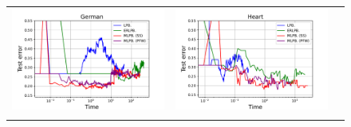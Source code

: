\begin{figure}[p]
\begin{tabular}{ccc}
\begin{minipage}[t]{0.31\hsize}
            \includegraphics[keepaspectratio, scale=0.30]
            {figure/test_logtime_german.pdf}
        \end{minipage}
        &
        \begin{minipage}[t]{0.31\hsize}
            \centering
            \includegraphics[keepaspectratio, scale=0.30]
            {figure/test_logtime_heart.pdf}
        \end{minipage}
        \\
        \begin{minipage}[t]{0.31\hsize}
            \centering
            \includegraphics[keepaspectratio, scale=0.30]

\end{minipage}
\end{tabular}
\end{figure}
